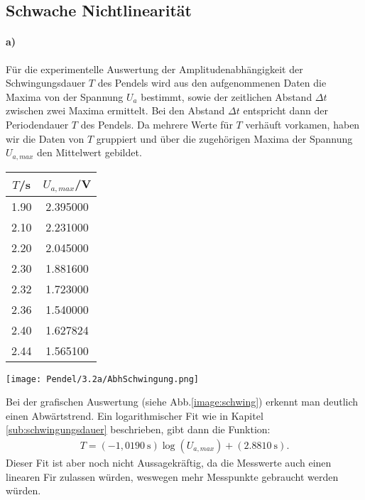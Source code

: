 \subsection{Schwache Nichtlinearität}
\label{sub:AuswertungweakLin}
\paragraph{a)}
Für die experimentelle Auswertung der Amplitudenabhängigkeit der Schwingungsdauer $T$ des Pendels  wird aus den aufgenommenen Daten die Maxima von der Spannung $U_{a}$ bestimmt, sowie der zeitlichen Abstand $\Delta t$ zwischen zwei Maxima ermittelt. Bei den Abstand $\Delta t$ entspricht dann der Periodendauer $T$ des Pendels. Da mehrere Werte für $T$ verhäuft vorkamen, haben wir die Daten von $T$ gruppiert und über die zugehörigen Maxima der Spannung $U_{a,max}$ den Mittelwert gebildet.
\begin{center}
    \begin{tabular}{c|c}
        $T$/s & $U_{a,max}$/V\\
        \hline
        1.90  &  2.395000 \\
        2.10  &  2.231000 \\
        2.20  &  2.045000 \\
        2.30  &  1.881600 \\
        2.32  &  1.723000 \\
        2.36  &  1.540000 \\
        2.40  &  1.627824 \\
        2.44  &  1.565100 \\
        \end{tabular}
\end{center}
\begin{center}
    \texttt{[image: Pendel/3.2a/AbhSchwingung.png]}
    \label{image:schwing}
\end{center}
Bei der grafischen Auswertung (siehe Abb.\ref{image:schwing}) erkennt man deutlich einen Abwärtstrend. Ein logarithmischer Fit wie in Kapitel \ref{sub:schwingungsdauer} beschrieben, gibt dann die Funktion:
\begin{gather}
    T=(-1,0190~\text{s})\log(U_{a,max}) + (2.8810~\text{s}).
\end{gather}
Dieser Fit ist aber noch nicht Aussagekräftig, da die Messwerte auch einen linearen Fir zulassen würden, weswegen mehr Messpunkte gebraucht werden würden.

